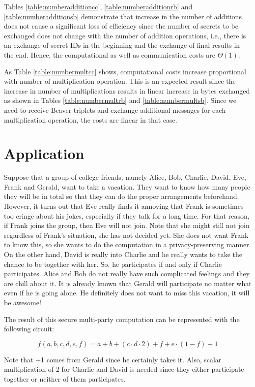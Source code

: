\documentclass[9pt,conference]{IEEEtran}
\begin{document}
Tables \ref{table:numberadditioncc},  \ref{table:numberadditionrb} and \ref{table:numberadditionsb} demonstrate that increase in the number of additions does not cause a significant loss of efficiency since the number of secrets to be exchanged does not change with the number of addition operations, i.e., there is an exchange of secret IDs in the beginning and the exchange of final results in the end. Hence, the computational as well as communication costs are $\Theta(1)$.

As Table \ref{table:numbermultcc} shows, computational costs increase proportional with number of multiplication operation. This is an expected result since the increase in number of multiplications results in linear increase in bytes exchanged as shown in Tables \ref{table:numbermultrb} and \ref{table:numbermultsb}. Since we need to receive Beaver triplets and exchange additional messages for each multiplication operation, the costs are linear in that case.

\section{Application}
Suppose that a group of college friends, namely Alice, Bob, Charlie, David, Eve, Frank and Gerald, want to take a vacation. They want to know how many people they will be in total so that they can do the proper arrangements beforehand. However, it turns out that Eve really finds it annoying that Frank is sometimes too cringe about his jokes, especially if they talk for a long time. For that reason, if Frank joins the group, then Eve will not join. Note that she might still not join regardless of Frank's situation, she has not decided yet. She does not want Frank to know this, so she wants to do the computation in a privacy-preserving manner. On the other hand, David is really into Charlie and he really wants to take the chance to be together with her. So, he participates if and only if Charlie participates. Alice and Bob do not really have such complicated feelings and they are chill about it. It is already known that Gerald will participate no matter what even if he is going alone. He definitely does not want to miss this vacation, it will be awesome!

The result of this secure multi-party computation can be represented with the following circuit:

$$f(a,b,c,d,e,f) = a+b+(c \cdot d \cdot 2) + f + e \cdot (1-f) + 1$$

Note that +1 comes from Gerald since he certainly takes it. Also, scalar multiplication of 2 for Charlie and David is needed since they either participate together or neither of them participates.
\end{document}
